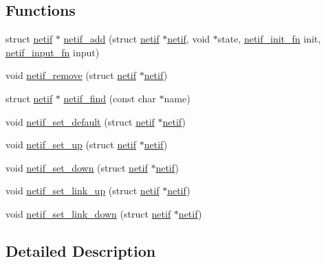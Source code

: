 \subsection*{Functions}
\begin{DoxyCompactItemize}
\item 
struct \hyperlink{structnetif}{netif} $\ast$ \hyperlink{group__netif_gabde72af134ae7047a46ad7719d2a1ee9}{netif\+\_\+add} (struct \hyperlink{structnetif}{netif} $\ast$\hyperlink{structnetif}{netif}, void $\ast$state, \hyperlink{openmote-cc2538_2lwip_2src_2include_2lwip_2netif_8h_a2b02a78a8769925ff8e4f83d34e5e1f5}{netif\+\_\+init\+\_\+fn} init, \hyperlink{openmote-cc2538_2lwip_2src_2include_2lwip_2netif_8h_ab2302b1b64ac7b95f24c6bab754a575e}{netif\+\_\+input\+\_\+fn} input)
\item 
void \hyperlink{group__netif_ga9c6e541f0c184e1ea61a5cd8afe3e979}{netif\+\_\+remove} (struct \hyperlink{structnetif}{netif} $\ast$\hyperlink{structnetif}{netif})
\item 
struct \hyperlink{structnetif}{netif} $\ast$ \hyperlink{group__netif_ga3c82d1c742338828b2f4349a75bb84de}{netif\+\_\+find} (const char $\ast$name)
\item 
void \hyperlink{group__netif_gac90f290edd005238d62aa94c4ac9dea3}{netif\+\_\+set\+\_\+default} (struct \hyperlink{structnetif}{netif} $\ast$\hyperlink{structnetif}{netif})
\item 
void \hyperlink{group__netif_gaf19693be401a265a52d2a56c65753121}{netif\+\_\+set\+\_\+up} (struct \hyperlink{structnetif}{netif} $\ast$\hyperlink{structnetif}{netif})
\item 
void \hyperlink{group__netif_ga641d07ed8c31fe5306bc01605a6790cf}{netif\+\_\+set\+\_\+down} (struct \hyperlink{structnetif}{netif} $\ast$\hyperlink{structnetif}{netif})
\item 
void \hyperlink{group__netif_gae0d2975f189277990e9d5276fdd9e9ea}{netif\+\_\+set\+\_\+link\+\_\+up} (struct \hyperlink{structnetif}{netif} $\ast$\hyperlink{structnetif}{netif})
\item 
void \hyperlink{group__netif_ga34e37a1e8e358760dc1c43887922c7db}{netif\+\_\+set\+\_\+link\+\_\+down} (struct \hyperlink{structnetif}{netif} $\ast$\hyperlink{structnetif}{netif})
\end{DoxyCompactItemize}


\subsection{Detailed Description}


